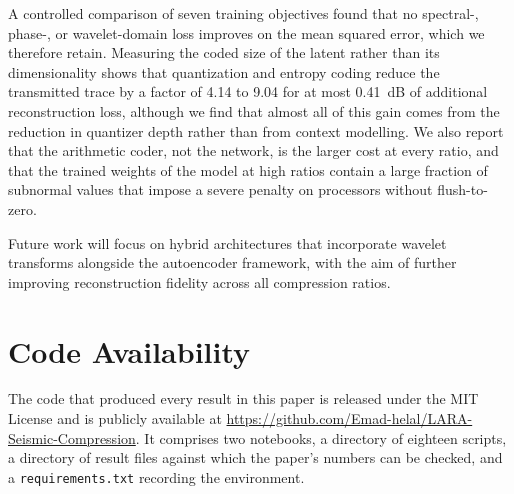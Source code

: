 \documentclass[fleqn,10pt]{wlscirep}
\begin{document}
A controlled comparison of seven training objectives found that no spectral-, phase-, or wavelet-domain loss improves on the mean squared error, which we therefore retain. Measuring the coded size of the latent rather than its dimensionality shows that quantization and entropy coding reduce the transmitted trace by a factor of 4.14 to 9.04 for at most 0.41~dB of additional reconstruction loss, although we find that almost all of this gain comes from the reduction in quantizer depth rather than from context modelling. We also report that the arithmetic coder, not the network, is the larger cost at every ratio, and that the trained weights of the model at high ratios contain a large fraction of subnormal values that impose a severe penalty on processors without flush-to-zero.

Future work will focus on hybrid architectures that incorporate wavelet transforms alongside the autoencoder framework, with the aim of further improving reconstruction fidelity across all compression ratios.

\section*{Code Availability}

The code that produced every result in this paper is released under the MIT License and is publicly available at \url{https://github.com/Emad-helal/LARA-Seismic-Compression}. It comprises two notebooks, a directory of eighteen scripts, a directory of result files against which the paper's numbers can be checked, and a \texttt{requirements.txt} recording the environment.
\end{document}
